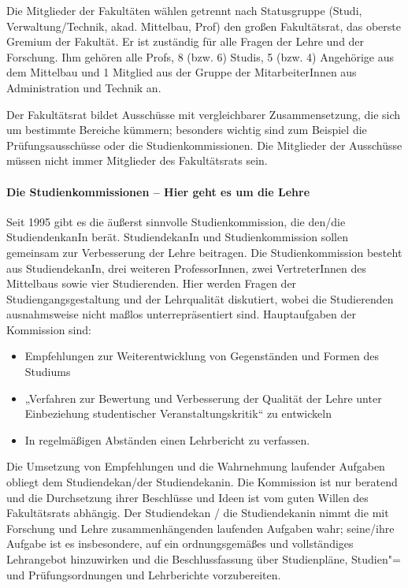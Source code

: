 Die Mitglieder der Fakultäten wählen getrennt nach Statusgruppe (Studi,
Verwaltung/Technik, akad. Mittelbau, Prof) den großen Fakultätsrat, das oberste
Gremium der Fakultät. Er ist zuständig für alle Fragen der Lehre und der
Forschung. Ihm gehören alle Profs, 8 (bzw. 6) Studis, 5 (bzw. 4) Angehörige aus
dem Mittelbau und 1 Mitglied aus der Gruppe der MitarbeiterInnen aus
Administration und Technik an.

Der Fakultätsrat bildet Ausschüsse mit vergleichbarer Zusammensetzung, die sich
um bestimmte Bereiche kümmern; besonders wichtig sind zum Beispiel die
Prüfungsausschüsse oder die Studienkommissionen. Die Mitglieder der Ausschüsse
müssen nicht immer Mitglieder des Fakultätsrats sein.


\paragraph{Die Studienkommissionen -- Hier geht es um die Lehre}

Seit 1995 gibt es die äußerst sinnvolle Studienkommission, die den/die
StudiendenkanIn berät. StudiendekanIn und Studienkommission sollen gemeinsam
zur Verbesserung der Lehre beitragen. Die Studienkommission besteht aus
StudiendekanIn, drei weiteren ProfessorInnen, zwei VertreterInnen des
Mittelbaus sowie vier Studierenden. Hier werden Fragen der
Studiengangsgestaltung und der Lehrqualität diskutiert, wobei die Studierenden
ausnahmsweise nicht maßlos unterrepräsentiert sind. Hauptaufgaben der
Kommission sind:
\begin{itemize}
    \addtolength{\itemsep}{-0.7\baselineskip}
    \item Empfehlungen zur Weiterentwicklung von Gegenständen und Formen des Studiums
    \item „Verfahren zur Bewertung und Verbesserung  der Qualität der Lehre unter
          Einbeziehung studentischer Veranstaltungskritik“ zu entwickeln
    \item In regelmäßigen Abständen einen Lehrbericht zu verfassen.
\end{itemize}

Die Umsetzung von Empfehlungen und die Wahrnehmung laufender Aufgaben obliegt
dem Studiendekan/der Studiendekanin. Die Kommission ist nur beratend und die
Durchsetzung ihrer Beschlüsse und Ideen ist vom guten Willen des Fakultätsrats
abhängig. Der Studiendekan / die Studiendekanin nimmt die mit Forschung und
Lehre zusammenhängenden laufenden Aufgaben wahr; seine/ihre Aufgabe ist es
insbesondere, auf ein ordnungsgemäßes und vollständiges Lehrangebot hinzuwirken
und die Beschlussfassung über Studienpläne, Studien"= und Prüfungsordnungen und
Lehrberichte vorzubereiten.
